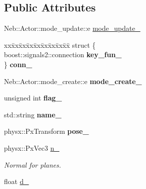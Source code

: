 \subsection*{Public Attributes}
\begin{DoxyCompactItemize}
\item 
Neb\-::\-Actor\-::mode\-\_\-update\-::e \hyperlink{classNeb_1_1Actor_1_1Base_ad51160f955b8bff638c938360ff3ce00}{mode\-\_\-update\-\_\-}
\item 
\hypertarget{classNeb_1_1Actor_1_1Base_af67fc9f70e192a9035e572cc95f5d820}{\begin{tabbing}
xx\=xx\=xx\=xx\=xx\=xx\=xx\=xx\=xx\=\kill
struct \{\\
\hypertarget{structNeb_1_1Actor_1_1Base_1_1@0_a354b206749d26c08ab4dea6ede9df2a5}{\>boost::signals2::connection {\bfseries key\_fun\_}\\
\} {\bfseries conn\_}}\label{classNeb_1_1Actor_1_1Base_af67fc9f70e192a9035e572cc95f5d820}
\\

\end{tabbing}\item 
\hypertarget{classNeb_1_1Actor_1_1Base_a1e076d29556f0c72028812137bcce036}{Neb\-::\-Actor\-::mode\-\_\-create\-::e {\bfseries mode\-\_\-create\-\_\-}}\label{classNeb_1_1Actor_1_1Base_a1e076d29556f0c72028812137bcce036}

\item 
\hypertarget{classNeb_1_1Actor_1_1Base_a7930c54d0205553e10e0cf05bd856b87}{unsigned int {\bfseries flag\-\_\-}}\label{classNeb_1_1Actor_1_1Base_a7930c54d0205553e10e0cf05bd856b87}

\item 
\hypertarget{classNeb_1_1Actor_1_1Base_aa75915d9b4f44a657a85033f5b81f75d}{std\-::string {\bfseries name\-\_\-}}\label{classNeb_1_1Actor_1_1Base_aa75915d9b4f44a657a85033f5b81f75d}

\item 
\hypertarget{classNeb_1_1Actor_1_1Base_aacd62145604cea516d4f1d8e25d548be}{physx\-::\-Px\-Transform {\bfseries pose\-\_\-}}\label{classNeb_1_1Actor_1_1Base_aacd62145604cea516d4f1d8e25d548be}

\item 
\hypertarget{classNeb_1_1Actor_1_1Base_aee5edd3b6023075d864409d97d0a2d08}{physx\-::\-Px\-Vec3 \hyperlink{classNeb_1_1Actor_1_1Base_aee5edd3b6023075d864409d97d0a2d08}{n\-\_\-}}\label{classNeb_1_1Actor_1_1Base_aee5edd3b6023075d864409d97d0a2d08}

\begin{DoxyCompactList}\small\item\em Normal for planes. \end{DoxyCompactList}\item 
\hypertarget{classNeb_1_1Actor_1_1Base_a2997b3c2a550037b6b7cefd17ad91df1}{float \hyperlink{classNeb_1_1Actor_1_1Base_a2997b3c2a550037b6b7cefd17ad91df1}{d\-\_\-}}\label{classNeb_1_1Actor_1_1Base_a2997b3c2a550037b6b7cefd17ad91df1}

}
\end{DoxyCompactItemize}
